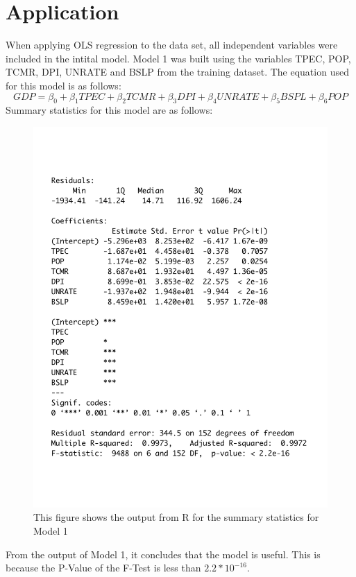 \documentclass[12pt]{article}
\begin{document}
\section*{Application}
When applying OLS regression to the data set, all independent variables were included in the intital model.
Model 1 was built using the variables TPEC, POP, TCMR, DPI, UNRATE and BSLP from the training dataset. 
The equation used for this model is as follows:
\begin{equation}
  GDP = \beta_0 + \beta_1 TPEC + \beta_2 TCMR+ \beta_3 DPI + \beta_4 UNRATE + \beta_5 BSPL +\beta_6 POP
\end{equation}
Summary statistics for this model are as follows:
\begin{figure}[H]
  \centering
  \includegraphics[scale = .5]{mod1output}
  \caption{This figure shows the output from R for the summary statistics for Model 1}
\end{figure}
From the output of Model 1, it concludes that the model is useful.
This is because the P-Value of the F-Test is less than $2.2 * 10^{-16}$.
\end{document}
